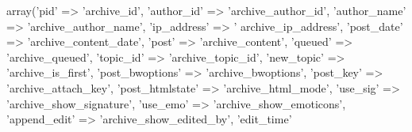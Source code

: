 \begin{DoxyCode}
 array(\textcolor{stringliteral}{'pid'}             => \textcolor{stringliteral}{'archive\_id'},
                                                          \textcolor{stringliteral}{'author\_id'}           
       => \textcolor{stringliteral}{'archive\_author\_id'},
                                                          \textcolor{stringliteral}{'author\_name'}         
       => \textcolor{stringliteral}{'archive\_author\_name'},
                                                      \textcolor{stringliteral}{'ip\_address'}       => \textcolor{stringliteral}{'
      archive\_ip\_address'},
                                                          \textcolor{stringliteral}{'post\_date'}        =>
       \textcolor{stringliteral}{'archive\_content\_date'},
                                                          \textcolor{stringliteral}{'post'}                
                => \textcolor{stringliteral}{'archive\_content'},
                                                          \textcolor{stringliteral}{'queued'}              
           => \textcolor{stringliteral}{'archive\_queued'},
                                                          \textcolor{stringliteral}{'topic\_id'}            
       => \textcolor{stringliteral}{'archive\_topic\_id'},
                                                          \textcolor{stringliteral}{'new\_topic'}           
       => \textcolor{stringliteral}{'archive\_is\_first'},
                                                          \textcolor{stringliteral}{'post\_bwoptions'}   =>
       \textcolor{stringliteral}{'archive\_bwoptions'},
                                                          \textcolor{stringliteral}{'post\_key'}            
       => \textcolor{stringliteral}{'archive\_attach\_key'},
                                                          \textcolor{stringliteral}{'post\_htmlstate'}   =>
       \textcolor{stringliteral}{'archive\_html\_mode'},
                                                          \textcolor{stringliteral}{'use\_sig'}             
       => \textcolor{stringliteral}{'archive\_show\_signature'},
                                                          \textcolor{stringliteral}{'use\_emo'}             
       => \textcolor{stringliteral}{'archive\_show\_emoticons'},
                                                          \textcolor{stringliteral}{'append\_edit'}         
       => \textcolor{stringliteral}{'archive\_show\_edited\_by'},
                                                          \textcolor{stringliteral}{'edit\_time'}           

\end{DoxyCode}
